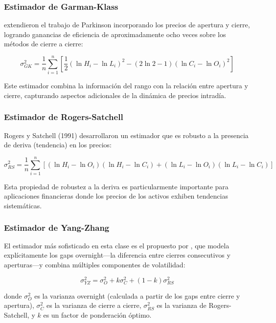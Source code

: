 \documentclass[11pt,a4paper]{article}
\begin{document}
\subsubsection{Estimador de Garman-Klass}

\citet{garman1980} extendieron el trabajo de Parkinson incorporando los precios de apertura y cierre, logrando ganancias de eficiencia de aproximadamente ocho veces sobre los métodos de cierre a cierre:

\begin{equation}
\sigma_{GK}^2 = \frac{1}{n}\sum_{i=1}^{n}\left[\frac{1}{2}(\ln H_i - \ln L_i)^2 - (2\ln 2-1)(\ln C_i - \ln O_i)^2\right]
\end{equation}

Este estimador combina la información del rango con la relación entre apertura y cierre, capturando aspectos adicionales de la dinámica de precios intradía.

\subsubsection{Estimador de Rogers-Satchell}

Rogers y Satchell (1991) desarrollaron un estimador que es robusto a la presencia de deriva (tendencia) en los precios:

\begin{equation}
\sigma_{RS}^2 = \frac{1}{n}\sum_{i=1}^{n}\left[(\ln H_i - \ln O_i)(\ln H_i - \ln C_i) + (\ln L_i - \ln O_i)(\ln L_i - \ln C_i)\right]
\end{equation}

Esta propiedad de robustez a la deriva es particularmente importante para aplicaciones financieras donde los precios de los activos exhiben tendencias sistemáticas.

\subsubsection{Estimador de Yang-Zhang}

El estimador más sofisticado en esta clase es el propuesto por \citet{yang2000}, que modela explícitamente los gaps overnight---la diferencia entre cierres consecutivos y aperturas---y combina múltiples componentes de volatilidad:

\begin{equation}
\sigma_{YZ}^2 = \sigma_O^2 + k\sigma_C^2 + (1-k)\sigma_{RS}^2
\end{equation}

donde $\sigma_O^2$ es la varianza overnight (calculada a partir de los gaps entre cierre y apertura), $\sigma_C^2$ es la varianza de cierre a cierre, $\sigma_{RS}^2$ es la varianza de Rogers-Satchell, y $k$ es un factor de ponderación óptimo.
\end{document}
